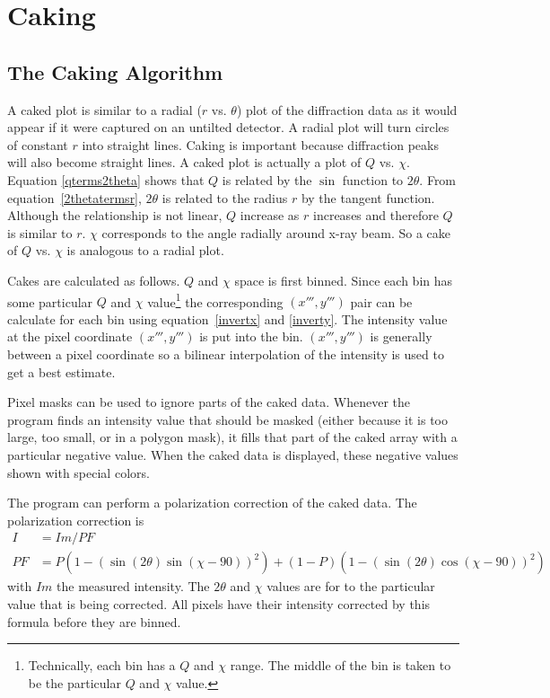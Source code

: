 \chapter{Caking}\label{Caking}

\section{The Caking Algorithm}

A caked plot is similar to a radial ($r$ vs. $\theta$) plot 
of the diffraction data as it would appear if it were
captured on an untilted detector. A radial plot will turn
circles of constant $r$ into straight lines.
Caking is important because diffraction peaks will 
also become straight lines. A caked plot is actually a 
plot of $Q$ vs. $\chi$. Equation \ref{qterms2theta} shows
that $Q$ is related by the $\sin$ function to 
$2\theta$. From equation~\ref{2thetatermsr},
$2\theta$ is related to the radius $r$ by the tangent function.
Although the relationship is not linear, $Q$ increase as $r$ 
increases and therefore $Q$ is similar to $r$.
$\chi$ corresponds to the angle radially around x-ray
beam. So a cake of $Q$ vs. $\chi$ is analogous to a radial 
plot.

Cakes are calculated as follows.
$Q$ and $\chi$ space is first binned. Since each bin has 
some particular $Q$ and $\chi$ value\footnote{Technically,
each bin has a $Q$ and $\chi$ range. The middle of the bin 
is taken to be the particular $Q$ and $\chi$ value.} 
the corresponding $(x''',y''')$ pair can be calculate for each
bin using equation~\ref{invertx} and \ref{inverty}. The
intensity value at the pixel coordinate $(x''',y''')$
is put into the bin.
$(x''',y''')$ is generally between a pixel coordinate so
a bilinear interpolation of the intensity is used to
get a best estimate.

Pixel masks can be used to ignore parts of the caked data.
Whenever the program finds an intensity value
that should be masked (either because it is too 
large, too small, or in a polygon mask), it fills
that part of the caked array with a particular 
negative value. When the caked data is displayed,
these negative values shown with special colors.

The program can perform a polarization correction of
the caked data. The polarization 
correction is
\begin{align}
    I&=Im/PF \\ 
    PF&=P(1 - (\sin(2\theta)\sin(\chi-90))^2) + 
    (1 - P)(1 - (\sin(2\theta)\cos(\chi-90))^2)
\end{align}
with $Im$ the measured intensity. The $2\theta$ and $\chi$
values are for to the particular value that is being 
corrected. All pixels have their 
intensity corrected by this formula before they
are binned.

